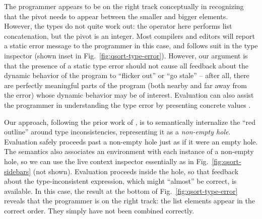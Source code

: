 The programmer appears to be on the right track conceptually
in recognizing that the pivot needs to appear between the 
smaller and bigger elements. 
However, the types do not quite work out: the  operator here
performs list concatenation, but the pivot is an integer. 
Most compilers and editors will report a static error message
to the programmer in this case, and \Hazel 
follows suit in the type inspector (shown inset in Fig.~\ref{fig:qsort-type-error}). 
However, our argument is that the presence of a static type error should not cause all feedback about 
the dynamic behavior of the program to ``flicker out'' or ``go stale'' --
after all, there are perfectly meaningful parts of the program (both nearby
and far away from the error) 
whose dynamic behavior may be of interest. Evaluation can also assist the programmer in understanding the type error by presenting concrete values \cite{Seidel2016}.

Our approach, following the prior work of \citet{popl-paper}, 
is to semantically internalize the ``red outline'' around
type inconsistencies, representing it as a \emph{non-empty hole}.
Evaluation safely proceeds past a non-empty hole just as if it were an empty hole.
The semantics also associates an environment with each instance of a non-empty hole,
so we can use the live context inspector essentially as in Fig.~\ref{fig:qsort-sidebars} (not shown). 
Evaluation proceeds inside the hole, so that 
feedback about the type-inconsistent expression, which might ``almost'' be correct, is available. 
In this case, the result at the bottom of Fig.~\ref{fig:qsort-type-error}
reveals that the programmer is on the right track: the list elements 
appear in the correct order.
They simply have not been combined correctly.







